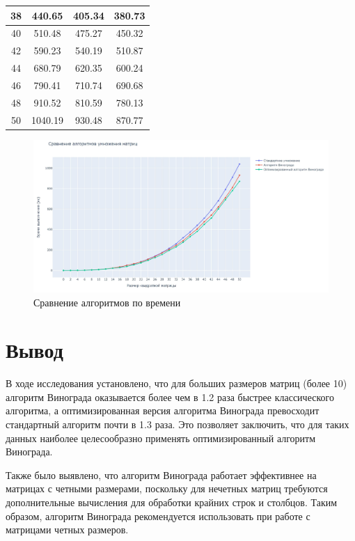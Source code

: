 \begin{table}[h]
\begin{center}
\begin{threeparttable}
\begin{tabular}{|c|c|c|c|}
                \hline
                38 & 440.65 & 405.34 & 380.73 \\
                \hline
                40 & 510.48 & 475.27 & 450.32 \\
                \hline
                42 & 590.23 & 540.19 & 510.87 \\
                \hline
                44 & 680.79 & 620.35 & 600.24 \\
                \hline
                46 & 790.41 & 710.74 & 690.68 \\
                \hline
                48 & 910.52 & 810.59 & 780.13 \\
                \hline
                50 & 1040.19 & 930.48 & 870.77 \\
                \hline
            \end{tabular}
        \end{threeparttable}
    \end{center}
\end{table}

\begin{figure}[H]
    \centering
    \includegraphics[width=1\linewidth]{images/plots/plot.jpg}
    \caption{Сравнение алгоритмов по времени}
    \label{fig:time_mes}
\end{figure}

\clearpage

\section{Вывод}

В ходе исследования установлено, что для больших размеров матриц (более 10) алгоритм Винограда оказывается более чем в 1.2 раза быстрее классического алгоритма, а оптимизированная версия алгоритма Винограда превосходит стандартный алгоритм почти в 1.3 раза. Это позволяет заключить, что для таких данных наиболее целесообразно применять оптимизированный алгоритм Винограда.

Также было выявлено, что алгоритм Винограда работает эффективнее на матрицах с четными размерами, поскольку для нечетных матриц требуются дополнительные вычисления для обработки крайних строк и столбцов. Таким образом, алгоритм Винограда рекомендуется использовать при работе с матрицами четных размеров.